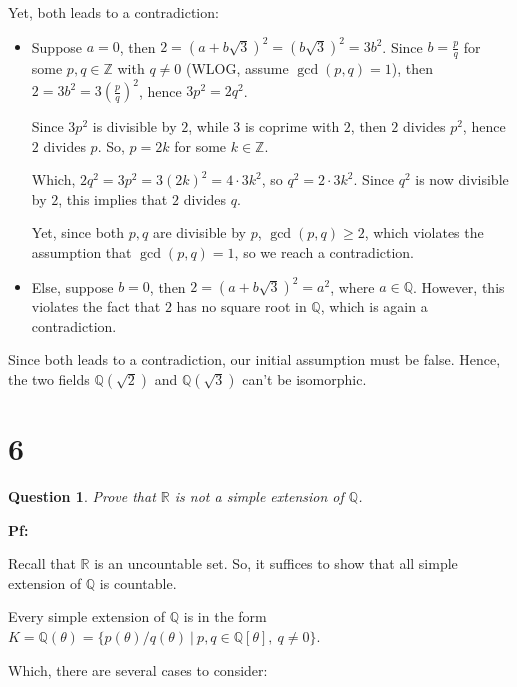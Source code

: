 \documentclass{article}
\newtheorem{question}{Question}
\begin{document}
Yet, both leads to a contradiction:
\begin{itemize}
    \item Suppose $a=0$, then $2=(a+b\sqrt{3})^2=(b\sqrt{3})^2=3b^2$. Since $b=\frac{p}{q}$ for some $p,q\in\mathbb{Z}$ with $q\neq 0$ (WLOG, assume $\gcd(p,q)=1$),
    then $2=3b^2=3(\frac{p}{q})^2$, hence $3p^2=2q^2$.
    
    Since $3p^2$ is divisible by $2$, while $3$ is coprime with $2$, then $2$ divides $p^2$, hence $2$ divides $p$. So, $p=2k$ for some $k\in\mathbb{Z}$.

    Which, $2q^2=3p^2=3(2k)^2=4\cdot 3k^2$, so $q^2=2\cdot 3k^2$. Since $q^2$ is now divisible by $2$, this implies that $2$ divides $q$.

    Yet, since both $p,q$ are divisible by $p$, $\gcd(p,q)\geq 2$, which violates the assumption that $\gcd(p,q)=1$, so we reach a contradiction.

    \hfil

    \item Else, suppose $b=0$, then $2=(a+b\sqrt{3})^2=a^2$, where $a\in\mathbb{Q}$. However, this violates the fact that $2$ has no square root in $\mathbb{Q}$, which is again a contradiction.
\end{itemize}

Since both leads to a contradiction, our initial assumption must be false. Hence, the two fields $\mathbb{Q}(\sqrt{2})$ and $\mathbb{Q}(\sqrt{3})$ can't be isomorphic.

\break

\section*{6}
\begin{myBox}[]{}
    \begin{question}
        Prove that $\mathbb{R}$ is not a simple extension of $\mathbb{Q}$.
    \end{question}
\end{myBox}

\textbf{Pf:}

Recall that $\mathbb{R}$ is an uncountable set. So, it suffices to show that all simple extension of $\mathbb{Q}$ is countable.

Every simple extension of $\mathbb{Q}$ is in the form $K=\mathbb{Q}(\theta) = \{p(\theta)/q(\theta)\ |\ p,q\in \mathbb{Q}[\theta],\ q\neq 0\}$.

Which, there are several cases to consider:
\end{document}

